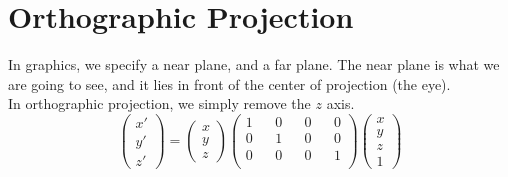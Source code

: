 \documentclass[12pt]{article}
\theoremstyle{definition}
\begin{document}
\section{Orthographic Projection}
In graphics, we specify a near plane, and a far plane. The near plane is what we are going to see, and it lies in front of the center of projection (the eye).
\\ \linebreak
In orthographic projection, we simply remove the $z$ axis. 
\\ \linebreak
$$ \begin{pmatrix}
x' \\ y' \\ z'
\end{pmatrix} =
\begin{pmatrix}
x \\ y \\ z
\end{pmatrix}
\begin{pmatrix}
1 && 0 && 0 && 0 \\
0 && 1 && 0 && 0 \\
0 && 0 && 0 && 1 \\
\end{pmatrix}
\begin{pmatrix}
x \\ y \\ z \\ 1
\end{pmatrix}$$
\end{document}
